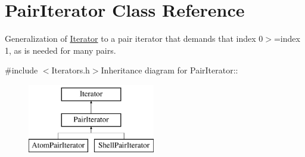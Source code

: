 \hypertarget{classJKBuilder_1_1PairIterator}{
\section{PairIterator Class Reference}
\label{classJKBuilder_1_1PairIterator}
}


Generalization of \hyperlink{classJKBuilder_1_1Iterator}{Iterator} to a pair iterator that demands that index 0$>$=index 1, as is needed for many pairs.  


{\ttfamily \#include $<$Iterators.h$>$}Inheritance diagram for PairIterator::\begin{figure}[H]
\begin{center}
\leavevmode
\includegraphics[height=3cm]{classJKBuilder_1_1PairIterator}
\end{center}
\end{figure}
